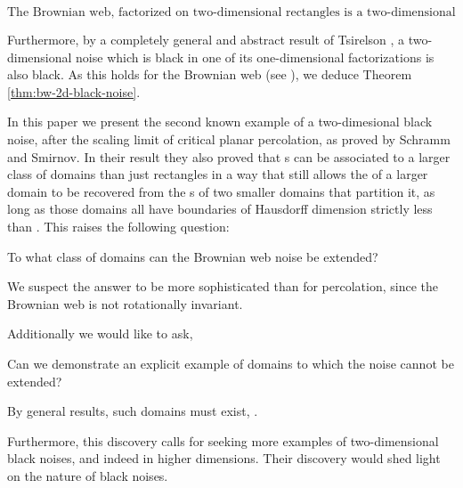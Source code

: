 {\[\text{The Brownian web, factorized on two-dimensional
rectangles is a two-dimensional noise.}\]

Furthermore, by a completely general and abstract result
of Tsirelson , a two-dimensional noise which is
black in one of its one-dimensional factorizations is also
black. As this holds for the Brownian web (see ),
we deduce Theorem \ref{thm:bw-2d-black-noise}.


In this paper we present the second known example of a two-dimesional
black noise, after the scaling limit of critical planar percolation,
as proved by Schramm and Smirnov.  In their result they also proved
that \sigfield{}s can be associated to a larger class of domains than
just rectangles in a way that still allows the \sigfield{} of a larger
domain to be recovered from the \sigfield{}s of two smaller domains
that partition it, as long as those domains all have boundaries of
Hausdorff dimension strictly less than .  This raises the following question:

\begin{openproblem}
  To what class of domains can the Brownian web noise be extended?
\end{openproblem}

We suspect the answer to be more sophisticated than for percolation,
since the Brownian web is not rotationally invariant.  

Additionally we would like to ask,

\begin{openproblem}
  Can we demonstrate an explicit example of domains to which the noise
  cannot be extended?
\end{openproblem}

By general results, such domains must exist, .

Furthermore, this discovery calls for seeking more examples of
two-dimensional black noises, and indeed in higher dimensions.  Their
discovery would shed light on the nature of black noises.

}
